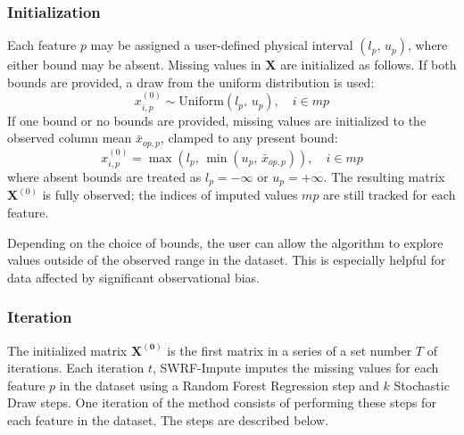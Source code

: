 \documentclass[preprint,longauthor,twocolumn]{aastex631}
\begin{document}
\subsubsection{Initialization}
Each feature $p$ may be assigned a user-defined physical interval $(l_p,\, u_p)$, where either bound may be absent. Missing values in $\mathbf{X}$ are initialized as follows. If both bounds are provided, a draw from the uniform distribution is used:
\begin{equation}
  x^{(0)}_{i,p} \sim \mathrm{Uniform}(l_p,\, u_p), \quad i \in mp
\end{equation}
If one bound or no bounds are provided, missing values are initialized to the observed column mean $\bar{x}_{op,p}$, clamped to any present bound:
\begin{equation}
  x^{(0)}_{i,p} = \max(l_p,\, \min(u_p,\, \bar{x}_{op,p})), \quad i \in mp
\end{equation}
where absent bounds are treated as $l_p = -\infty$ or $u_p = +\infty$. The resulting matrix $\mathbf{X}^{(0)}$ is fully observed; the indices of imputed values $mp$ are still tracked for each feature.

Depending on the choice of bounds, the user can allow the algorithm to explore values outside of the observed range in the dataset. This is especially helpful for data affected by significant observational bias.

\subsubsection{Iteration}
The initialized matrix $\mathbf{X^{(0)}}$ is the first matrix in a series of a set number $T$ of iterations. Each iteration $t$, SWRF-Impute imputes the missing values for each feature $p$ in the dataset using a Random Forest Regression step and $k$ Stochastic Draw steps. One iteration of the method consists of performing these steps for each feature in the dataset. The steps are described below.
\end{document}
